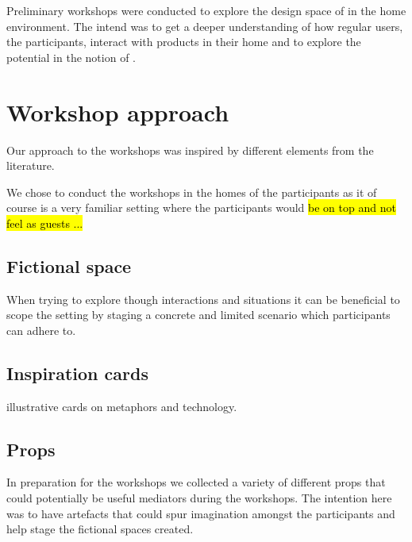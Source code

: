 
Preliminary workshops were conducted to explore the design space of  in the home environment.
The intend was to get a deeper understanding of how regular users, the participants, interact with products in their home and to explore the potential in the notion of .

\section{Workshop approach}
\label{ch:workshops:approach}
Our approach to the workshops was inspired by different elements from the literature. \todo{\dots}

We chose to conduct the workshops in the homes of the participants as it of course is a very familiar setting where the participants would \hl{be on top and not feel as guests ...}

\subsection{Fictional space}
\label{ch:workshops:approach:fictional-space}

When trying to explore though interactions and situations it can be beneficial to scope the setting by staging a concrete and limited scenario which participants can adhere to.


\subsection{Inspiration cards}
\label{ch:workshops:approach:inspiration-cards}
illustrative cards on metaphors and technology.

\subsection{Props}
\label{ch:workshops:approach:props}

In preparation for the workshops we collected a variety of different props that could potentially be useful mediators during the workshops.
The intention here was to have artefacts that could spur imagination amongst the participants and help stage the fictional spaces created.

